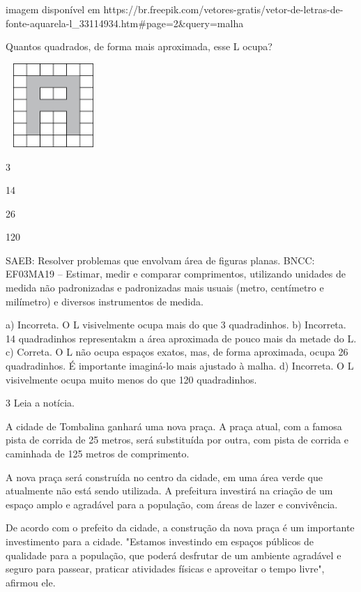 \Inserir imagem disponível em https://br.freepik.com/vetores-gratis/vetor-de-letras-de-fonte-aquarela-l_33114934.htm#page=2&query=malha%

Quantos quadrados, de forma mais aproximada, esse L ocupa?

\includegraphics[width=1.42949in,height=1.25160in]{media/image62.png}

\begin{escolha}
\item
  3
\item
  14
\item
  26
\item
  120
\end{escolha}

SAEB: Resolver problemas que envolvam área de figuras planas. 
BNCC: EF03MA19 -- Estimar, medir e comparar comprimentos, utilizando unidades de medida
não padronizadas e padronizadas mais usuais (metro, centímetro e milímetro) e diversos
instrumentos de medida.

a) Incorreta. O L visivelmente ocupa mais do que 3 quadradinhos.
b) Incorreta. 14 quadradinhos representakm a área aproximada de pouco mais da metade do L.
c) Correta. O L não ocupa espaços exatos, mas, de forma aproximada, ocupa 26 quadradinhos. É importante imaginá-lo mais ajustado à malha.
d) Incorreta. O L visivelmente ocupa muito menos do que 120 quadradinhos.

\num{3} Leia a notícia.


A cidade de Tombalina ganhará uma nova praça. A praça atual, com a famosa pista de corrida de 25 metros, será substituída por outra, com pista de corrida e caminhada de 125 metros de comprimento.

A nova praça será construída no centro da cidade, em uma área verde que atualmente não está sendo utilizada. A prefeitura investirá na criação de um espaço amplo e agradável para a população, com áreas de lazer e convivência.

De acordo com o prefeito da cidade, a construção da nova praça é um importante investimento para a cidade. "Estamos investindo em espaços públicos de qualidade para a população, que poderá desfrutar de um ambiente agradável e seguro para passear, praticar atividades físicas e aproveitar o tempo livre", afirmou ele.

